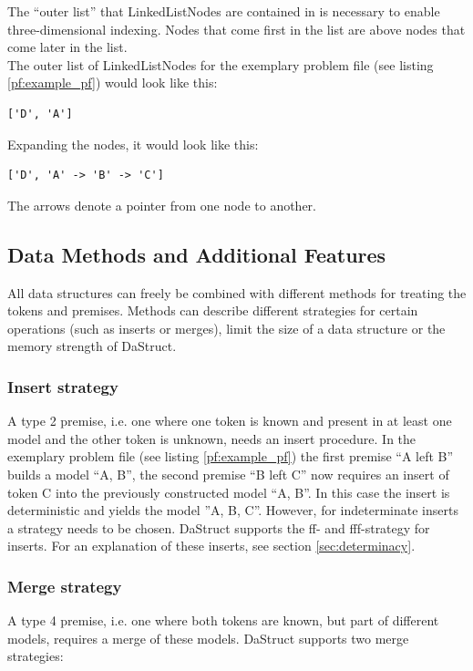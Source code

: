 \documentclass[hidelinks]{scrartcl}
\begin{document}
The ``outer list'' that LinkedListNodes are contained in is necessary to enable three-dimensional indexing. Nodes that come first in the list are above nodes that come later in the list. \\
The outer list of LinkedListNodes for the exemplary problem file (see listing \ref{pf:example_pf}) would look like this:

\begin{lstlisting}[caption=LinkedList representation, label=linkedlist_example_pf, frame=single]
['D', 'A']
\end{lstlisting}

\noindent Expanding the nodes, it would look like this:

\begin{lstlisting}[caption=Expanded LinkedList representation, label=exp_linkedlist_example_pf, frame=single]
['D', 'A' -> 'B' -> 'C']
\end{lstlisting}

The arrows denote a pointer from one node to another.

\subsection{Data Methods and Additional Features}\label{sec:data_methods}
All data structures can freely be combined with different methods for treating the \gls{token}s and \gls{premise}s. Methods can describe different strategies for certain operations (such as inserts or merges), limit the size of a data structure or the memory strength of DaStruct.

\subsubsection{Insert strategy}
A type 2 \gls{premise}, i.e. one where one \gls{token} is known and present in at least one model and the other \gls{token} is unknown, needs an insert procedure. In the exemplary problem file (see listing \ref{pf:example_pf}) the first \gls{premise} ``A left B'' builds a model ``A, B'', the second \gls{premise} ``B left C'' now requires an insert of \gls{token} C into the previously constructed model ``A, B''. In this case the insert is deterministic and yields the model ''A, B, C''. However, for indeterminate inserts a strategy needs to be chosen. DaStruct supports the ff- and fff-strategy for inserts. For an explanation of these inserts, see section \ref{sec:determinacy}.

\subsubsection{Merge strategy}\label{sec:merge_strategy}
A type 4 \gls{premise}, i.e. one where both \gls{token}s are known, but part of different models, requires a merge of these models. DaStruct supports two merge strategies: \\
\end{document}
